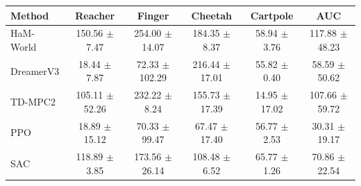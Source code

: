 \begin{tabular}{lccccc}
\toprule
Method & Reacher & Finger & Cheetah & Cartpole & AUC \\
\midrule
HaM-World & 150.56 $\pm$ 7.47 & 254.00 $\pm$ 14.07 & 184.35 $\pm$ 8.37 & 58.94 $\pm$ 3.76 & 117.88 $\pm$ 48.23 \\
DreamerV3 & 18.44 $\pm$ 7.87 & 72.33 $\pm$ 102.29 & 216.44 $\pm$ 17.01 & 55.82 $\pm$ 0.40 & 58.59 $\pm$ 50.62 \\
TD-MPC2 & 105.11 $\pm$ 52.26 & 232.22 $\pm$ 8.24 & 155.73 $\pm$ 17.39 & 14.95 $\pm$ 17.02 & 107.66 $\pm$ 59.72 \\
PPO & 18.89 $\pm$ 15.12 & 70.33 $\pm$ 99.47 & 67.47 $\pm$ 17.40 & 56.77 $\pm$ 2.53 & 30.31 $\pm$ 19.17 \\
SAC & 118.89 $\pm$ 3.85 & 173.56 $\pm$ 26.14 & 108.48 $\pm$ 6.52 & 65.77 $\pm$ 1.26 & 70.86 $\pm$ 22.54 \\
\bottomrule
\end{tabular}